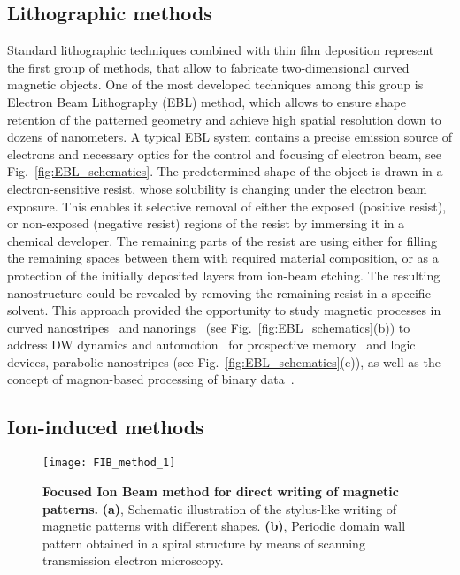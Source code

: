 \subsection{Lithographic methods}

Standard lithographic techniques combined with thin film deposition represent the first group of methods, that allow to fabricate two-dimensional curved magnetic objects. One of the most developed techniques among this group is Electron Beam Lithography (EBL) method, which allows to ensure shape retention of the patterned geometry and achieve high spatial resolution down to dozens of nanometers. A typical EBL system contains a precise emission source of electrons and necessary optics for the control and focusing of electron beam, see Fig.~\ref{fig:EBL_schematics}. The predetermined shape of the object is drawn in a electron-sensitive resist, whose solubility is changing under the electron beam exposure. This enables it selective removal of either the exposed (positive resist), or non-exposed (negative resist) regions of the resist by immersing it in a chemical developer. The remaining parts of the resist are using either for filling the remaining spaces between them with required material composition, or as a protection of the initially deposited layers from ion-beam etching. The resulting nanostructure could be revealed by removing the remaining resist in a specific solvent. This approach provided the opportunity to study magnetic processes in curved nanostripes~\cite{Lewis09,Nahrwold09,Glathe12} and nanorings~\cite{Castano03,Klaui03a,Klaui05a,Klaui08,Richter16,Mawass17} (see Fig.~\ref{fig:EBL_schematics}(b)) to address DW dynamics and automotion~\cite{Mawass17} for prospective memory~\cite{Hayashi07,Parkin08,Parkin15} and logic~\cite{Allwood02,Allwood04,Allwood05,Hrkac11} devices, parabolic nanostripes (see Fig.~\ref{fig:EBL_schematics}(c)), as well as the concept of magnon-based processing of binary data~\cite{Schneider08,Lee08e,Vogt12,Vogt14,Chumak15}.



\subsection{Ion-induced methods}

\begin{figure}[t]
	\centering
	\texttt{[image: FIB\_method\_1]}
	\caption{\label{fig:FIB_schematics}%
		\textbf{Focused Ion Beam method for direct writing of magnetic patterns.} \textbf{(a)}, Schematic illustration of the stylus-like writing of magnetic patterns with different shapes. \textbf{(b)}, Periodic domain wall pattern obtained in a spiral structure by means of scanning transmission electron microscopy.
	}
\end{figure}

